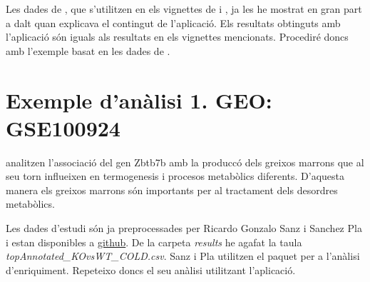 Les dades de \cite{schmidt2008humoral}, que s'utilitzen en els vignettes de  i , ja les he mostrat en gran part a dalt quan explicava el contingut de l'aplicació. Els resultats obtinguts amb l'aplicació són iguals als resultats en els vignettes mencionats. Procediré doncs amb l'exemple basat en les dades de \cite{li2017zbtb7b} .

\section{Exemple d'anàlisi 1. GEO: GSE100924}

\cite{li2017zbtb7b} analitzen l'associació del gen Zbtb7b amb la produccó dels greixos marrons que al seu torn influeixen en termogenesis i procesos metabòlics diferents. D'aquesta manera els greixos marrons són importants per al tractament dels desordres metabòlics.

Les dades d'estudi són ja preprocessades per Ricardo Gonzalo Sanz i Sanchez Pla i estan disponibles a \href{https://github.com/alexsanchezpla/StatisticalAnalysisOfMicroarrayData}{github}. De la carpeta \textit{results} he agafat la taula \textit{topAnnotated\_KOvsWT\_COLD.csv}. Sanz i Pla utilitzen el paquet  per a l'anàlisi d'enriquiment. Repeteixo doncs el seu anàlisi utilitzant l'aplicació. 


